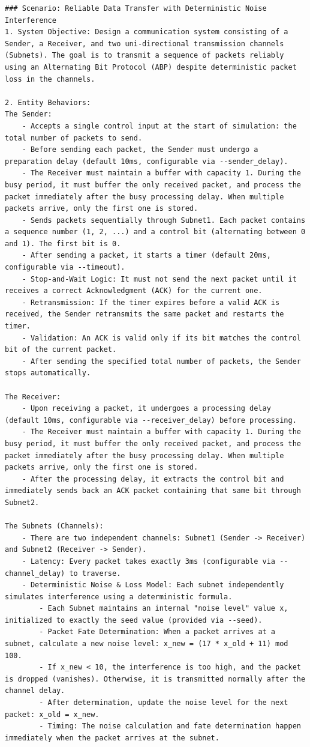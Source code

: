 \begin{lstlisting}[caption={Behavioral Specification}]
### Scenario: Reliable Data Transfer with Deterministic Noise Interference
1. System Objective: Design a communication system consisting of a Sender, a Receiver, and two uni-directional transmission channels (Subnets). The goal is to transmit a sequence of packets reliably using an Alternating Bit Protocol (ABP) despite deterministic packet loss in the channels.

2. Entity Behaviors:
The Sender:
    - Accepts a single control input at the start of simulation: the total number of packets to send.
    - Before sending each packet, the Sender must undergo a preparation delay (default 10ms, configurable via --sender_delay).
    - The Receiver must maintain a buffer with capacity 1. During the busy period, it must buffer the only received packet, and process the packet immediately after the busy processing delay. When multiple packets arrive, only the first one is stored.
    - Sends packets sequentially through Subnet1. Each packet contains a sequence number (1, 2, ...) and a control bit (alternating between 0 and 1). The first bit is 0.
    - After sending a packet, it starts a timer (default 20ms, configurable via --timeout).
    - Stop-and-Wait Logic: It must not send the next packet until it receives a correct Acknowledgment (ACK) for the current one.
    - Retransmission: If the timer expires before a valid ACK is received, the Sender retransmits the same packet and restarts the timer.
    - Validation: An ACK is valid only if its bit matches the control bit of the current packet.
    - After sending the specified total number of packets, the Sender stops automatically.

The Receiver:
    - Upon receiving a packet, it undergoes a processing delay (default 10ms, configurable via --receiver_delay) before processing.
    - The Receiver must maintain a buffer with capacity 1. During the busy period, it must buffer the only received packet, and process the packet immediately after the busy processing delay. When multiple packets arrive, only the first one is stored.
    - After the processing delay, it extracts the control bit and immediately sends back an ACK packet containing that same bit through Subnet2.

The Subnets (Channels):
    - There are two independent channels: Subnet1 (Sender -> Receiver) and Subnet2 (Receiver -> Sender).
    - Latency: Every packet takes exactly 3ms (configurable via --channel_delay) to traverse.
    - Deterministic Noise & Loss Model: Each subnet independently simulates interference using a deterministic formula.
        - Each Subnet maintains an internal "noise level" value x, initialized to exactly the seed value (provided via --seed).
        - Packet Fate Determination: When a packet arrives at a subnet, calculate a new noise level: x_new = (17 * x_old + 11) mod 100.
        - If x_new < 10, the interference is too high, and the packet is dropped (vanishes). Otherwise, it is transmitted normally after the channel delay.
        - After determination, update the noise level for the next packet: x_old = x_new.
        - Timing: The noise calculation and fate determination happen immediately when the packet arrives at the subnet.


\end{lstlisting}
